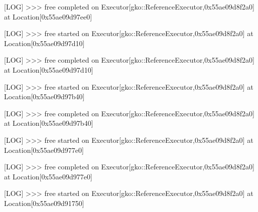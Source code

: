 \begin{DoxyCode}
                                                               
[LOG] >>> free completed on Executor[gko::ReferenceExecutor,0x55ae09d8f2a0] at Location[0x55ae09d97ee0]    
                                                                                                                  
                                                               
[LOG] >>> free started on Executor[gko::ReferenceExecutor,0x55ae09d8f2a0] at Location[0x55ae09d97d10]      
                                                                                                                  
                                                               
[LOG] >>> free completed on Executor[gko::ReferenceExecutor,0x55ae09d8f2a0] at Location[0x55ae09d97d10]    
                                                                                                                  
                                                               
[LOG] >>> free started on Executor[gko::ReferenceExecutor,0x55ae09d8f2a0] at Location[0x55ae09d97b40]      
                                                                                                                  
                                                               
[LOG] >>> free completed on Executor[gko::ReferenceExecutor,0x55ae09d8f2a0] at Location[0x55ae09d97b40]    
                                                                                                                  
                                                               
[LOG] >>> free started on Executor[gko::ReferenceExecutor,0x55ae09d8f2a0] at Location[0x55ae09d977e0]      
                                                                                                                  
                                                               
[LOG] >>> free completed on Executor[gko::ReferenceExecutor,0x55ae09d8f2a0] at Location[0x55ae09d977e0]    
                                                                                                                  
                                                               
[LOG] >>> free started on Executor[gko::ReferenceExecutor,0x55ae09d8f2a0] at Location[0x55ae09d91750]      
                                                                                                                  

\end{DoxyCode}
